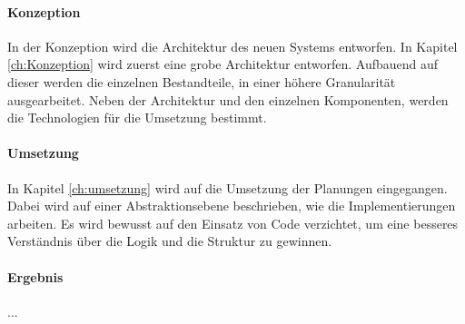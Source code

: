 \paragraph{Konzeption} In der Konzeption wird die Architektur des neuen Systems entworfen. In Kapitel \ref{ch:Konzeption} wird zuerst eine grobe Architektur entworfen. Aufbauend auf dieser werden die einzelnen Bestandteile, in einer höhere Granularität ausgearbeitet. Neben der Architektur und den einzelnen Komponenten, werden die Technologien für die Umsetzung bestimmt. 

\paragraph{Umsetzung} In Kapitel \ref{ch:umsetzung} wird auf die Umsetzung der Planungen eingegangen. Dabei wird auf einer Abstraktionsebene beschrieben, wie die Implementierungen arbeiten. Es wird bewusst auf den Einsatz von Code verzichtet, um eine besseres Verständnis über die Logik und die Struktur zu gewinnen. 

\paragraph{Ergebnis}  ...


